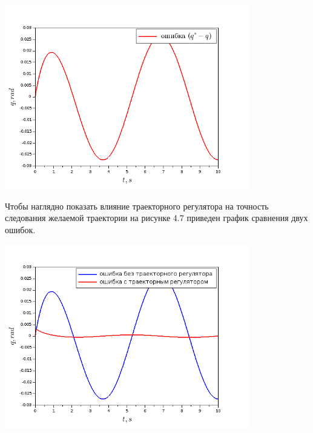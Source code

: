 \begin{center}
    \includegraphics[width=0.8\textwidth]{Lab4/images/Error_without.png}\\
\end{center}
\newpage
Чтобы наглядно показать влияние траекторного регулятора на точность следования желаемой траектории на рисунке 4.7 приведен график сравнения двух ошибок.
\begin{center}
    \includegraphics[width=0.8\textwidth]{Lab4/images/Error_comparison.png}\\
\end{center}